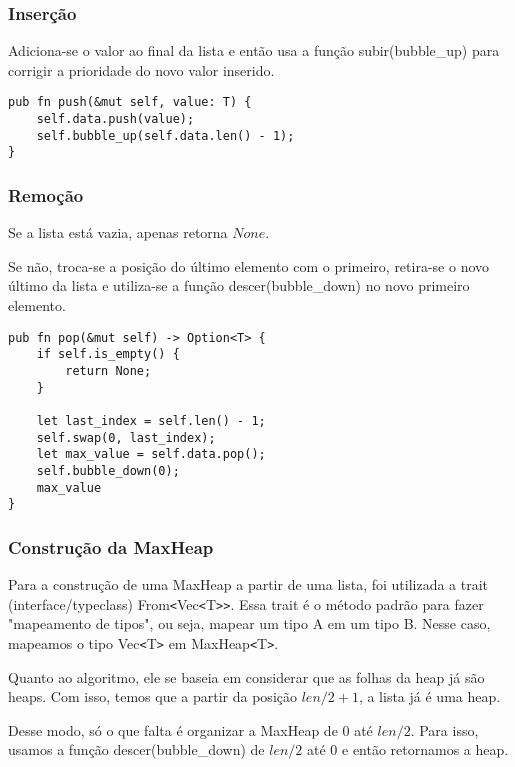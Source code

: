\subsubsection{Inserção}

Adiciona-se o valor ao final da lista e então usa a função subir(bubble\_up)
para corrigir a prioridade do novo valor inserido.

\begin{lstlisting}
pub fn push(&mut self, value: T) {
    self.data.push(value);
    self.bubble_up(self.data.len() - 1);
}
\end{lstlisting}

\subsubsection{Remoção}

Se a lista está vazia, apenas retorna $None$.

Se não, troca-se a posição do último elemento com o primeiro,
retira-se o novo último da lista e utiliza-se a função descer(bubble\_down)
no novo primeiro elemento.

\begin{lstlisting}
pub fn pop(&mut self) -> Option<T> {
    if self.is_empty() {
        return None;
    }

    let last_index = self.len() - 1;
    self.swap(0, last_index);
    let max_value = self.data.pop();
    self.bubble_down(0);
    max_value
}
\end{lstlisting}

\subsubsection{Construção da MaxHeap}

Para a construção de uma MaxHeap a partir de uma lista,
foi utilizada a trait (interface/typeclass)
From\texttt{<}Vec\texttt{<}T\texttt{>}\texttt{>}.
Essa trait é o método padrão para fazer "mapeamento de tipos",
ou seja, mapear um tipo A em um tipo B. Nesse caso,
mapeamos o tipo Vec\texttt{<}T\texttt{>} em MaxHeap\texttt{<}T\texttt{>}.

Quanto ao algoritmo, ele se baseia em considerar que as folhas da heap já
são heaps. Com isso, temos que a partir da posição $len/2 + 1$, a lista já é uma heap.

Desse modo, só o que falta é organizar a MaxHeap de $0$ até $len/2$. Para isso, usamos
a função descer(bubble\_down) de $len/2$ até $0$ e então retornamos a heap.


